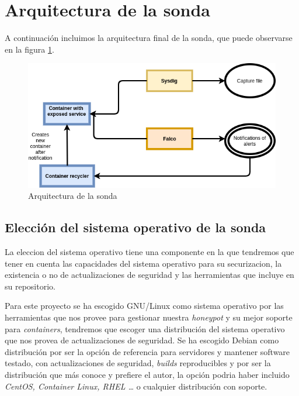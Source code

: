 \section{Arquitectura de la sonda}

A continuación incluimos la arquitectura final de la sonda, que puede observarse en la figura \ref{fig:arquitectura-sonda}.

\begin{figure}[h]
    \centering
      \includegraphics[scale=0.5]{images/probe_architecture}
    \caption{Arquitectura de la sonda}
    \label{fig:arquitectura-sonda}
  \end{figure}

\subsection{Elección del sistema operativo de la sonda}
\label{subsec:sonda-so}
  
La eleccion del sistema operativo tiene una componente en la que tendremos que tener en cuenta las capacidades del sistema operativo para su securizacion,
la existencia o no de actualizaciones de seguridad y las herramientas que incluye en su repositorio.

Para este proyecto se ha escogido GNU/Linux como sistema operativo por las herramientas que nos provee para gestionar nuestra \emph{honeypot} y su mejor soporte
para \emph{containers}, tendremos que escoger una distribución del sistema operativo que nos provea de actualizaciones de seguridad. 
Se ha escogido Debian como distribución por ser la opción de referencia para servidores y mantener software testado, con actualizaciones de seguridad, 
\emph{builds} reproducibles y por ser la distribución que más conoce y prefiere el autor,
 la opción podria haber incluido \emph{CentOS, Container Linux, RHEL \ldots} o cualquier distribución con soporte. 


